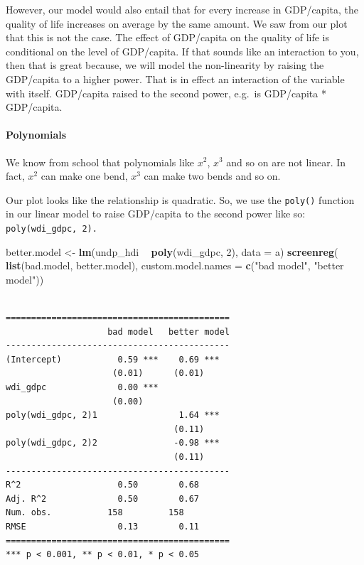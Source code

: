 \documentclass[]{article}
\newenvironment{Shaded}{\begin{snugshade}}{\end{snugshade}}
\newcommand{\KeywordTok}[1]{\textcolor[rgb]{0.13,0.29,0.53}{\textbf{#1}}}
\newcommand{\DataTypeTok}[1]{\textcolor[rgb]{0.13,0.29,0.53}{#1}}
\newcommand{\DecValTok}[1]{\textcolor[rgb]{0.00,0.00,0.81}{#1}}
\newcommand{\StringTok}[1]{\textcolor[rgb]{0.31,0.60,0.02}{#1}}
\newcommand{\OperatorTok}[1]{\textcolor[rgb]{0.81,0.36,0.00}{\textbf{#1}}}
\newcommand{\NormalTok}[1]{#1}
\let\oldparagraph\paragraph
\renewcommand{\paragraph}[1]{\oldparagraph{#1}\mbox{}}
\theoremstyle{definition}
\theoremstyle{definition}
\theoremstyle{definition}
\theoremstyle{remark}
\begin{document}
However, our model would also entail that for every increase in
GDP/capita, the quality of life increases on average by the same amount.
We saw from our plot that this is not the case. The effect of GDP/capita
on the quality of life is conditional on the level of GDP/capita. If
that sounds like an interaction to you, then that is great because, we
will model the non-linearity by raising the GDP/capita to a higher
power. That is in effect an interaction of the variable with itself.
GDP/capita raised to the second power, e.g.~is GDP/capita * GDP/capita.

\paragraph{Polynomials}\label{polynomials}

We know from school that polynomials like \(x^2\), \(x^3\) and so on are
not linear. In fact, \(x^2\) can make one bend, \(x^3\) can make two
bends and so on.

Our plot looks like the relationship is quadratic. So, we use the
\texttt{poly()} function in our linear model to raise GDP/capita to the
second power like so: \texttt{poly(wdi\_gdpc,\ 2).}

\begin{Shaded}
\begin{Highlighting}[]
\NormalTok{better.model <-}\StringTok{ }\KeywordTok{lm}\NormalTok{(undp_hdi }\OperatorTok{~}\StringTok{ }\KeywordTok{poly}\NormalTok{(wdi_gdpc, }\DecValTok{2}\NormalTok{), }\DataTypeTok{data =}\NormalTok{ a)}
\KeywordTok{screenreg}\NormalTok{( }\KeywordTok{list}\NormalTok{(bad.model, better.model), }
           \DataTypeTok{custom.model.names =} \KeywordTok{c}\NormalTok{(}\StringTok{"bad model"}\NormalTok{, }\StringTok{"better model"}\NormalTok{))}
\end{Highlighting}
\end{Shaded}

\begin{verbatim}

============================================
                    bad model   better model
--------------------------------------------
(Intercept)           0.59 ***    0.69 ***  
                     (0.01)      (0.01)     
wdi_gdpc              0.00 ***              
                     (0.00)                 
poly(wdi_gdpc, 2)1                1.64 ***  
                                 (0.11)     
poly(wdi_gdpc, 2)2               -0.98 ***  
                                 (0.11)     
--------------------------------------------
R^2                   0.50        0.68      
Adj. R^2              0.50        0.67      
Num. obs.           158         158         
RMSE                  0.13        0.11      
============================================
*** p < 0.001, ** p < 0.01, * p < 0.05
\end{verbatim}
\end{document}
